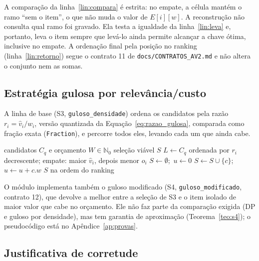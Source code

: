 \documentclass[11pt,a4paper]{article}
\theoremstyle{plain}
\theoremstyle{definition}
\theoremstyle{plain}
\begin{document}
A comparação da linha~\ref{lin:compara} é estrita: no empate, a célula mantém o ramo
``sem o item'', o que não muda o valor de $E[i][w]$. A reconstrução não consulta qual ramo
foi gravado. Ela testa a igualdade da linha~\ref{lin:leva} e, portanto, leva o item sempre
que levá-lo ainda permite alcançar a chave ótima, inclusive no empate. A ordenação final
pela posição no ranking (linha~\ref{lin:retorno}) segue o contrato 11 de
\texttt{docs/CONTRATOS\_AV2.md} e não altera o conjunto nem as somas.

\subsection{Estratégia gulosa por relevância/custo}
\label{sec:guloso}

A linha de base (S3, \texttt{guloso\_densidade}) ordena os candidatos pela razão
$r_i=\hat{v}_i/w_i$, versão quantizada da Equação~\eqref{eq:razao_gulosa}, comparada como fração exata
(\texttt{Fraction}), e percorre todos eles, levando cada um que ainda cabe.

\begin{algorithm}[htbp]
\caption{Guloso por relevância/custo (\texttt{guloso\_densidade}, S3)}
\label{alg:guloso}
\begin{algorithmic}[1]
\Require candidatos $C_q$ e orçamento $W\in\mathbb{N}_0$
\Ensure seleção viável $S$
  \State {}
  \State $L\gets C_q$ ordenada por $r_i$ decrescente; empate: maior $\hat{v}_i$, depois menor $o_i$
  \State $S\gets\emptyset$;\ $u\gets 0$ 
      \State $S\gets S\cup\{c\}$;\ $u\gets u+c.w$ 
    \EndIf
  \EndFor
  \State \Return $S$ na ordem do ranking
\EndFunction
\end{algorithmic}
\end{algorithm}

O módulo implementa também o guloso modificado (S4, \texttt{guloso\_modificado},
contrato 12), que devolve a melhor entre a seleção de S3 e o item isolado de maior valor
que cabe no orçamento. Ele não faz parte da comparação exigida (DP e guloso por
densidade), mas tem garantia de
aproximação (Teorema~\ref{teo:s4}); o pseudocódigo está no Apêndice~\ref{ap:provas}.

\subsection{Justificativa de corretude}
\label{sec:corretude}
\end{document}
